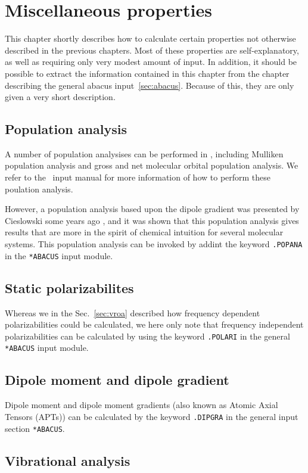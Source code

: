 \chapter{Miscellaneous properties}\label{ch:miscprop}

This chapter shortly describes how to calculate certain properties not
otherwise described in the previous chapters. Most of these properties
are self-explanatory, as well as requiring only very modest amount of
input. In addition, it should be possible to extract the information
contained in this chapter from the chapter describing the general
abacus input~\ref{sec:abacus}. Because of this, they are only given a
very short description.

\section{Population analysis}\label{sec:popana}

A number of population analysises can be performed in \sir , including
Mulliken population analysis and gross and net molecular orbital
population analysis. We refer to the \sir\ input manual for more
information of how to perform these poulation analysis.

However, a population analysis based upon the dipole gradient was
presented by Cieslowski some years ago \cite{jcjacs111}, and it was
shown that this population analysis gives results that are more in the
spirit of chemical intuition for several molecular systems. This
population analysis can be invoked by addint the keyword
\verb|.POPANA| in the \verb|*ABACUS| input module.

\section{Static polarizabilites}\label{sec:polari}

Whereas we in the Sec.~\ref{sec:vroa} described how frequency
dependent polarizabilities could be calculated, we here only note that
frequency independent polarizabilities can be calculated by using the
keyword \verb|.POLARI| in the general \verb|*ABACUS| input module.

\section{Dipole moment and dipole gradient}\label{sec:dipmom}

Dipole moment and dipole moment gradients (also known as Atomic Axial
Tensors (APTs)) can be calculated by the
keyword \verb|.DIPGRA| in the general input section \verb|*ABACUS|.

\section{Vibrational analysis}\label{sec:vibrasjon}

